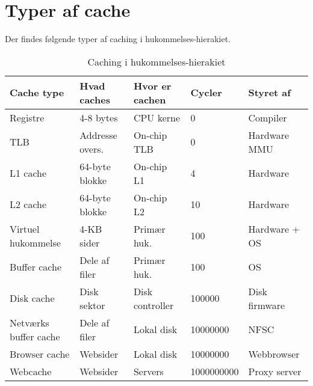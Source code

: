 \section{Typer af cache}
Der findes følgende typer af caching i hukommelses-hierakiet.
\begin{table}[h!]
    \centering
    \begin{tabular}{lllll}
        \hline
        Cache type&Hvad caches&Hvor er cachen&Cycler&Styret af\\\hline
        Registre&4-8 bytes&CPU kerne&0&Compiler\\
        TLB&Addresse overs.&On-chip TLB&0&Hardware MMU\\
        L1 cache&64-byte blokke&On-chip L1&4&Hardware\\
        L2 cache&64-byte blokke&On-chip L2&10&Hardware\\
        Virtuel hukommelse&4-KB sider&Primær huk.&100&Hardware + OS\\
        Buffer cache&Dele af filer&Primær huk.&100&OS\\
        Disk cache&Disk sektor&Disk controller&100000&Disk firmware\\
        Netværks buffer cache&Dele af filer&Lokal disk&10000000&NFSC\\
        Browser cache&Websider&Lokal disk&10000000&Webbrowser\\
        Webcache&Websider&Servers&1000000000&Proxy server\\\hline
    \end{tabular}
    \caption{Caching i hukommelses-hierakiet}
    \label{tab:memhier}
\end{table}
